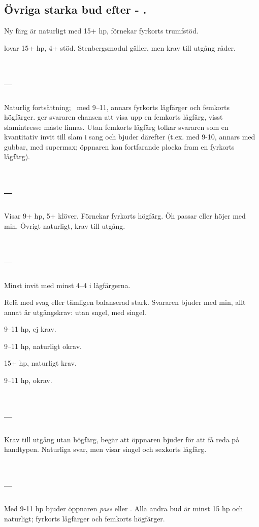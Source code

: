 \subsection{Övriga starka bud efter  - .}

Ny f\"arg \"ar natur\-ligt med 15+ hp, f\"or\-nekar fyrkorts trumf\-st{\"o}d.

 lovar 15+ hp, 4+ stöd. Stenbergsmodul gäller, men krav till utgång
råder. 

\section{ -- }

Naturlig forts\"attning; \pass\ med 9--11,
annars fyrkorts l{\aa}gf\"arger och femkorts h\"ogf\"arger.
 ger svararen chansen att
visa upp en femkorts l{\aa}gf\"arg, visst slamintresse m{\aa}ste finnas.
Utan femkorts l{\aa}gf\"arg tolkar svararen  som en kvantitativ invit
till slam i sang och bjuder d\"arefter (t.ex.  med 9-10, annars
 med gubbar,  med supermax; \"oppnaren kan fortfarande
plocka fram en fyrkorts l{\aa}gf\"arg).

\section{ -- }

Visar 9+ hp, 5+ klöver. Förnekar fyrkorts högfärg. Öh passar eller höjer
med min. Övrigt naturligt, krav till utgång.

\section{ -- }

Minst invit med minst 4--4 i lågfärgerna.
\bbe
\item[\spa{2}] Relä med svag eller tämligen balanserad stark. Svararen
  bjuder  med min, allt annat är utgångskrav:  utan sngel,
   med singel.
\item[\NT{2}] 9--11 hp, ej krav.
\item[\la{3}] 9--11 hp, naturligt okrav.
\item[\ho{3}] 15+ hp, naturligt krav.
\item[\NT{3}] 9--11 hp, okrav.
\ebe

\section{ -- }
  
Krav till utgång utan högfärg, begär att öppnaren bjuder  för att få
reda på handtypen. Naturliga svar, men  visar singel och sexkorts
lågfärg. 
 
\section{ -- }
Med 9-11 hp bjuder \"oppnaren {\em pass} eller . Alla andra bud \"ar
minst 15 hp och naturligt; fyrkorts l{\aa}gf{\"a}rger
och femkorts h{\"o}gf{\"a}rger.
